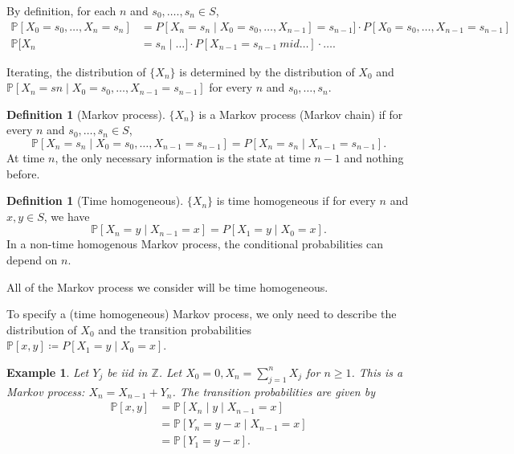 \documentclass{tufte-handout}
\newcommand*\Z{\mathbb{Z}}
\renewcommand*\P{\mathbb{P}}
\newtheorem{ex}[thm]{Example}
\theoremstyle{definition}
\newtheorem{defn}[thm]{Definition}
\begin{document}
By definition, for each $n$ and $s_0,\ldots.,s_n \in S$,
\begin{align*}
	\P[X_0=s_0, \ldots, X_n = s_n] &= P[X_n = s_n \mid X_0 = s_0, \ldots, X_{n-1}] = s_{n-1}] \cdot P[X_0 = s_0,\ldots,X_{n-1} = s_{n-1}] \\
	\P[X_n &= s_n \mid \ldots] \cdot P[X_{n-1} = s_{n-1} \ mid \ldots] \cdot \ldots
.\end{align*}

Iterating, the distribution of $\{X_n\}$ is determined by the distribution of $X_0$ and $\P\left[ X_n = sn \mid X_0 = s_0,\ldots,X_{n-1} = s_{n-1} \right]$ for every $n$ and $s_0,\ldots,s_n$.

\begin{defn}[Markov process]
	$\{X_n\}$ is a Markov process (Markov chain) if for every $n$ and $s_0,\ldots,s_n \in S$, \[
		\P\left[ X_n = s_n \mid X_0 = s_0, \ldots, X_{n-1} = s_{n-1} \right] = P\left[ X_n = s_n \mid X_{n-1} = s_{n-1} \right] 
	.\] At time $n$, the only necessary information is the state at time $n-1$ and nothing before.
\end{defn}

\begin{defn}[Time homogeneous]
	$\{X_n\}$ is time homogeneous if for every $n$ and $x,y \in S$, we have \[
		\P\left[ X_n = y \mid X_{n-1} = x \right] = P\left[ X_1 = y \mid X_0 = x \right] 
	.\] In a non-time homogenous Markov process, the conditional probabilities can depend on $n$. 
\end{defn}

All of the Markov process we consider will be time homogeneous.

To specify a (time homogeneous) Markov process, we only need to describe the distribution of $X_0$ and the transition probabilities $\P\left[ x,y \right] \coloneqq P\left[ X_1 = y \mid X_0 = x \right].$

\begin{ex}
	Let $Y_j$ be iid in $\Z$. Let $X_0 = 0, X_n = \sum\limits_{j=1}^{n} X_j$ for $n \ge 1$. This is a Markov process: $X_n = X_{n-1} + Y_n$. The transition probabilities are given by 
	\begin{align*}
		\P[x,y]  &= \P\left[ X_n \mid y \mid X_{n-1} = x \right]  \\
		&= \P\left[ Y_n = y - x \mid X_{n-1} = x \right] \\
		&= \P\left[ Y_1 = y-x \right] 
	.\end{align*}
\end{ex}
\end{document}
